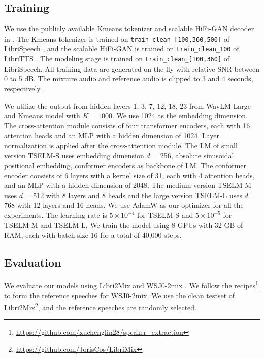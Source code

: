 \documentclass[conference]{IEEEtran}
\begin{document}
\subsection{Training}

We use the publicly available Kmeans tokenizer and scalable 
HiFi-GAN decoder in \cite{speechbrain}. The Kmeans tokenizer
is trained on \texttt{train\_clean\_[100,360,500]} of
LibriSpeech \cite{librispeech}, and the scalable HiFi-GAN is trained on \texttt{train\_clean\_100} of 
LibriTTS \cite{libritts}. The modeling stage is trained on 
\texttt{train\_clean\_[100,360]} of LibriSpeech. All training data are 
generated on the fly with relative SNR between 0 to 5 dB. The mixture audio and reference audio is clipped to 3 and 4 seconds, respectively.

We utilize the output from hidden layers 1, 3, 7, 12, 18, 23 from WavLM Large and Kmeans model with 
\(K=1000\).
We use 1024 as the embedding dimension.  The cross-attention module consists of four transformer encoders, each with 16 attention heads and an MLP with a hidden dimension of 1024. Layer normalization is applied after the cross-attention module.
The LM of small version TSELM-S uses 
embedding dimension \(d\) = 256, absolute sinusoidal positional embedding, conformer encoders as backbone of LM. The conformer encoder consists of 6 layers with a kernel size of 31, each with 4 attention heads, and an MLP with a hidden dimension of 2048. The medium version TSELM-M uses \(d\) = 512 with 8 layers and 8 heads and the large version TSELM-L uses 
\(d\) = 768 with 12 layers and 16 heads. We use AdamW as 
our optimizer for all the experiments. The learning rate 
is \(5 \times 10^{-4}\) for TSELM-S and \(5 \times 10^{-5}\) for TSELM-M and TSELM-L. We train the model using 8 GPUs with 32 GB of RAM, each with batch size 16 for a total of 40,000 steps.


\subsection{Evaluation}


We evaluate our models using Libri2Mix\cite{librimix} and WSJ0-2mix \cite{wsj0}.
We follow the recipes\footnote{\href{https://github.com/xuchenglin28/speaker_extraction}{https://github.com/xuchenglin28/speaker\_extraction}} to form the reference speeches for 
WSJ0-2mix.
We use the clean testset of Libri2Mix\footnote{\href{https://github.com/JorisCos/LibriMix}{https://github.com/JorisCos/LibriMix}}, and the reference speeches are randomly selected.
\end{document}
